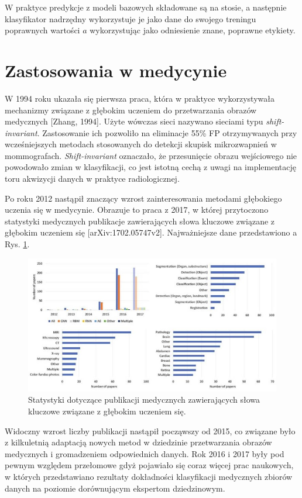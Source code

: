 W praktyce predykcje z modeli bazowych składowane są na stosie, a następnie klasyfikator nadrzędny wykorzystuje je jako dane do swojego treningu poprawnych wartości $a$ wykorzystując jako odniesienie znane, poprawne etykiety.
 

\section{Zastosowania w medycynie}

W 1994 roku ukazała się pierwsza praca, która w praktyce wykorzystywała mechanizmy związane z głębokim uczeniem do przetwarzania obrazów medycznych [Zhang, 1994]. Użyte wówczas sieci nazywano sieciami typu \textit{shift-invariant}. Zastosowanie ich pozwoliło na eliminacje 55\% FP otrzymywanych przy wcześniejszych metodach stosowanych do detekcji skupisk mikrozwapnień w mommografach. \textit{Shift-invariant} oznaczało, że przesunięcie obrazu wejściowego nie powodowało zmian w klasyfikacji, co jest istotną cechą z uwagi na implementację toru akwizycji danych w praktyce radiologicznej.

Po roku 2012 nastąpił znaczący wzrost zainteresowania metodami głębokiego uczenia się w medycynie. Obrazuje to praca z 2017, w której przytoczono statystyki medycznych publikacje zawierających słowa kluczowe związane z głębokim uczeniem się [arXiv:1702.05747v2]. Najważniejsze dane przedstawiono a Rys. \ref{DL_CAD_stats}.
\begin{figure}[h!]
	\centering
	\includegraphics[width=1\textwidth]{figures/DL_CAD_statystyka.jpg}
	\caption{Statystyki dotyczące publikacji medycznych zawierających słowa kluczowe związane z głębokim uczeniem się.}
	\label{DL_CAD_stats}
\end{figure}

 Widoczny wzrost liczby publikacji nastąpił począwszy od 2015, co związane było z kilkuletnią adaptacją nowych metod w dziedzinie przetwarzania obrazów medycznych i gromadzeniem odpowiednich danych. Rok 2016 i 2017 były pod pewnym względem przełomowe gdyż pojawiało się coraz więcej prac naukowych, w których przedstawiano rezultaty dokładności klasyfikacji medycznych zbiorów danych na poziomie dorównującym ekspertom dziedzinowym.
 
